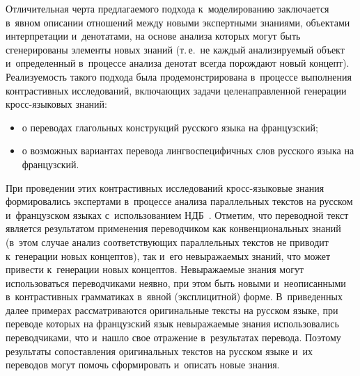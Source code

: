 {\begin{multicols}{2}





      
      
      Отличительная черта предлагаемого подхода к~моделированию заключается в~явном 
описании
 отношений между новыми экспертными знаниями, объектами интерпретации 
и~денотатами, на основе анализа которых могут быть сгенерированы элементы новых знаний (т.\,е.\ не 
каждый анализируемый объект и~определенный в~процессе анализа денотат всегда 
порождают новый концепт). Реализуемость такого подхода была продемонстрирована 
в~процессе выполнения контрастивных исследований, включающих задачи целенаправленной 
генерации кросс-язы\-ко\-вых знаний:
      \begin{itemize}
\item о переводах глагольных конструкций русского языка на французский;
\item о возможных вариантах перевода лингвоспецифичных слов русского языка 
на французский.
\end{itemize}

      При проведении этих контрастивных исследований кросс-язы\-ко\-вые знания 
формировались экспертами в~процессе анализа параллельных текстов на русском 
и~французском языках с~использованием НДБ~\cite{30-zat, 31-zat}. 
Отметим, что переводной текст является результатом применения переводчиком как 
конвенциональных знаний (в~этом случае анализ соответствующих параллельных текстов 
не приводит к~генерации новых концептов), так и~его невыражаемых знаний, что может 
привести к~генерации новых концептов. Невыражаемые знания могут использоваться 
переводчиками неявно, при этом быть новыми и~неописанными в~контрастивных 
грамматиках в~явной (эксплицитной) форме. В~приведенных далее примерах 
рас\-смат\-ри\-ва\-ют\-ся оригинальные тексты на русском языке, при переводе которых на 
французский язык невыражаемые знания использовались переводчиками, что и~нашло свое 
отражение в~результатах перевода. Поэтому результаты сопоставления оригинальных 
текстов на русском языке и~их переводов могут помочь сформировать и~описать новые 
знания.

     
      

\end{multicols}}
